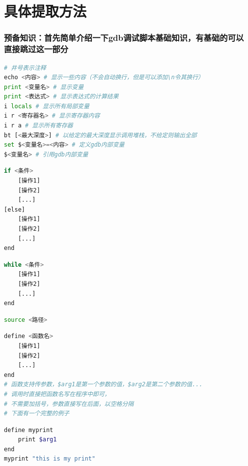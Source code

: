 \documentclass[]{report}
\begin{document}
\section{具体提取方法}

\subsubsection{预备知识：首先简单介绍一下gdb调试脚本基础知识，有基础的可以直接跳过这一部分}

\begin{lstlisting}[caption={常用语句},language=python,morekeywords={echo,i,bt,r,a}]
# 井号表示注释
echo <内容> # 显示一些内容（不会自动换行，但是可以添加\n令其换行）
print <变量名> # 显示变量
print <表达式> # 显示表达式的计算结果
i locals # 显示所有局部变量
i r <寄存器名> # 显示寄存器内容
i r a # 显示所有寄存器
bt [<最大深度>] # 以给定的最大深度显示调用堆栈，不给定则输出全部
set $<变量名>=<内容> # 定义gdb内部变量
$<变量名> # 引用gdb内部变量
\end{lstlisting}

\begin{lstlisting}[caption={条件分支语句},language=Bash,morekeywords={end}]
if <条件>
    [操作1]
    [操作2]
    [...]
[else]
    [操作1]
    [操作2]
    [...]
end
\end{lstlisting}

\begin{lstlisting}[caption={循环语句},language=Bash,morekeywords={end}]
while <条件>
    [操作1]
    [操作2]
    [...]
end
\end{lstlisting}

\begin{lstlisting}[caption={调用其他的gdb脚本（可以模块化调试脚本，使其更加简洁优美）},language=Bash]
source <路径>
\end{lstlisting}

\begin{lstlisting}[caption={定义函数/过程},language=Bash,morekeywords={define,end}]
define <函数名>
    [操作1]
    [操作2]
    [...]
end
# 函数支持传参数，$arg1是第一个参数的值，$arg2是第二个参数的值...
# 调用时直接把函数名写在程序中即可，
# 不需要加括号，参数直接写在后面，以空格分隔
# 下面有一个完整的例子
\end{lstlisting}

\begin{lstlisting}[caption={一个完整的定义函数例子},language=Bash,morekeywords={define,end,print}]
define myprint
    print $arg1
end
myprint "this is my print"
\end{lstlisting}
\end{document}
